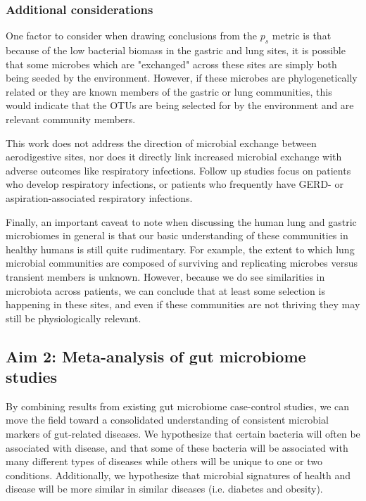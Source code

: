 \documentclass[12pt]{article}
\begin{document}
\subsubsection{Additional considerations}
One factor to consider when drawing conclusions from the $p_s$ metric is that because of the low bacterial biomass in the gastric and lung sites, it is possible that some microbes which are "exchanged" across these sites are simply both being seeded by the environment. However, if these microbes are phylogenetically related or they are known members of the gastric or lung communities, this would indicate that the OTUs are being selected for by the environment and are relevant community members.

This work does not address the direction of microbial exchange between aerodigestive sites, nor does it directly link increased microbial exchange with adverse outcomes like respiratory infections. Follow up studies focus on patients who develop respiratory infections, or patients who frequently have GERD- or aspiration-associated respiratory infections. 

Finally, an important caveat to note when discussing the human lung and gastric microbiomes in general is that our basic understanding of these communities in healthy humans is still quite rudimentary. For example, the extent to which lung microbial communities are composed of surviving and replicating microbes versus transient members is unknown. However, because we do see similarities in microbiota across patients, we can conclude that at least some selection is happening in these sites, and even if these communities are not thriving they may still be physiologically relevant.

\subsection{Aim 2: Meta-analysis of gut microbiome studies}\label{sec:aim2}
By combining results from existing gut microbiome case-control studies, we can move the field toward a consolidated understanding of consistent microbial markers of gut-related diseases. We hypothesize that certain bacteria will often be associated with disease, and that some of these bacteria will be associated with many different types of diseases while others will be unique to one or two conditions. Additionally, we hypothesize that microbial signatures  of health and disease will be more similar in similar diseases (i.e. diabetes and obesity).
\end{document}

